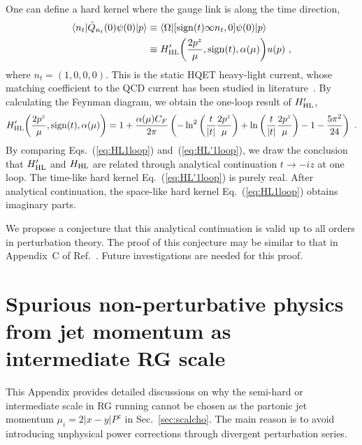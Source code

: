 \documentclass[a4paper,11pt]{article}
\begin{document}
One can define a hard kernel where the gauge link is along the time direction,
\begin{align}\label{eq:defHLsuda2}
\langle n_t|\bar Q_{n_t}(0)\psi(0)|p\rangle &\equiv \langle \Omega| [{\rm sign}(t)\infty n_t,0]\psi(0)|p\rangle \nonumber\\
&\equiv H_{\rm HL}'\bigg(\frac{2 p^z}{\mu},{\rm sign}(t),\alpha(\mu)\bigg) u(p) \ ,
\end{align}
where $n_t = (1,0,0,0)$. This is the static HQET heavy-light current, whose matching coefficient to the QCD current has been studied in literature~\cite{Eichten:1989zv, Broadhurst:1994se, Grozin:1998kf, BEKAVAC201046}. By calculating the Feynman diagram, we obtain the one-loop result of $H_{\rm HL}'$,
\begin{align}\label{eq:HL'1loop}
H_{\rm HL}'\bigg(\frac{2 p^z}{\mu},{\rm sign}(t),\alpha(\mu)\bigg) = 1 + \frac{\alpha(\mu) C_F}{2 \pi} \left( -\ln^2\left( \frac{t}{|t|}\frac{2 p^z}{\mu} \right) + \ln\left( \frac{t}{|t|}\frac{2 p^z}{\mu} \right) - 1 - \frac{5 \pi^2}{24} \right)  \ .
\end{align}
By comparing Eqs.~(\ref{eq:HL1loop}) and~(\ref{eq:HL'1loop}), we draw the conclusion that $H_{\rm HL}'$ and $H_{\rm HL}$ are related through analytical continuation $t \rightarrow -i z$ at one loop. The time-like hard kernel Eq.~(\ref{eq:HL'1loop}) is purely real. After analytical continuation, the space-like hard kernel Eq.~(\ref{eq:HL1loop}) obtains imaginary parts. 

We propose a conjecture that this analytical continuation is valid up to all orders in perturbation theory. The proof of this conjecture may be similar to that in Appendix~C of Ref.~\cite{Ji:2023pba}. Future investigations are needed for this proof. 



\section{Spurious non-perturbative physics from jet momentum as intermediate RG scale}\label{sec:LPS}

This Appendix provides detailed discussions on why the semi-hard or intermediate scale in RG running cannot be chosen as the partonic jet momentum $\mu_i = 2|x-y| P^z$ in Sec.~\ref{sec:scalcho}. The main reason is to avoid introducing unphysical power corrections through divergent perturbation series. 
\end{document}
